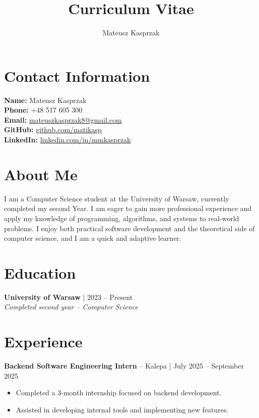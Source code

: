 \documentclass[a4paper,10pt]{article}
\begin{document}
\title{\vspace{-3cm}Curriculum Vitae}
\author{Mateusz Kasprzak}
\date{}

\maketitle

\section*{Contact Information}
\begin{tabbing}
\textbf{Name:} \hspace{2.1cm} Mateusz Kasprzak \\
\textbf{Phone:} \hspace{2.0cm} +48 517 605 300 \\
\textbf{Email:} \hspace{2.1cm} \href{mailto:mateuszkasprzak8@gmail.com}{mateuszkasprzak8@gmail.com} \\
\textbf{GitHub:} \hspace{1.8cm} \href{https://github.com/matikasp}{github.com/matikasp} \\
\textbf{LinkedIn:} \hspace{1.6cm} \href{https://linkedin.com/in/mmkasprzak}{linkedin.com/in/mmkasprzak}
\end{tabbing}

\section*{About Me}
I am a Computer Science student at the University of Warsaw, currently completed my second Year. I am eager to gain more professional experience and apply my knowledge of programming, algorithms, and systems to real-world problems. I enjoy both practical software development and the theoretical side of computer science, and I am a quick and adaptive learner.

\section*{Education}
\textbf{University of Warsaw} | 2023 -- Present \\
\emph{Completed second year -- Computer Science}

\section*{Experience}
\textbf{Backend Software Engineering Intern} -- Kalepa | July 2025 -- September 2025
\begin{itemize}[left=0pt]
    \item Completed a 3-month internship focused on backend development.
    \item Assisted in developing internal tools and implementing new features.
\end{itemize}
\end{document}
